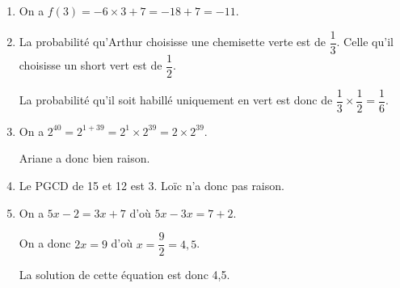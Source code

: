 
\medskip

\begin{enumerate}
\item On a $f(3) = - 6 \times 3 + 7 = -18 + 7 = -11$.
\item La probabilité qu'Arthur choisisse une chemisette verte est de $\dfrac{1}{3}$. Celle qu'il choisisse un short vert est de $\dfrac{1}{2}$.
  
La probabilité qu'il soit habillé uniquement en vert est donc de $\dfrac{1}{3} \times \dfrac{1}{2} = \dfrac{1}{6}$.
\item On a $2^{40} = 2^{1 + 39} = 2^1 \times 2^{39} = 2 \times 2^{39}$.
  
Ariane a donc bien raison.
\item Le PGCD de 15 et 12 est 3. Loïc n'a donc pas raison.
\item On a $5x - 2 = 3x + 7$ d'où $5x - 3x = 7 + 2$.
  
On a donc $2x = 9$ d'où $x = \dfrac{9}{2} = 4,5$.
  
La solution de cette équation est donc 4,5.
\end{enumerate}


